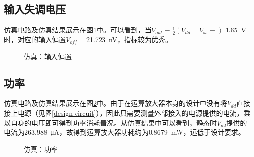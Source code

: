 \documentclass[UTF8]{ctexart}
\numberwithin{figure}{subsection}
\numberwithin{table}{subsection}
\numberwithin{equation}{subsection}
\begin{document}
\subsection{输入失调电压}
仿真电路及仿真结果展示在图\ref{Voff simulation}中。可以看到，当\(V_{out} = \frac{1}{2}\left(V_{dd} + V_{ss} = \right)\) \SI[]{1.65}{\volt}时，对应的输入偏置\(V_{off} = \)\SI[]{21.723}{\nano\volt}，指标较为优秀。

\begin{figure}[H]
    \centering
    \caption{仿真：输入偏置}
    \label{Voff simulation}
\end{figure}

\subsection{功率}
仿真电路及仿真结果展示在图\ref{Pdiss simulation}中。由于在运算放大器本身的设计中没有将\(V_{dd}\)直接接上电源（见图\ref{design circuit}），因此只需要测量外部接入的电源提供的电流，乘以自身的电压即可得到功率消耗情况。从仿真结果中可以看到，静态时\(V_{dd}\)提供的电流为\SI[]{263.988}{\micro\ampere}，故得到运算放大器功耗约为\SI[]{0.8679}{\milli\watt}，远低于设计要求。

\begin{figure}[H]
    \centering
    \caption{仿真：功率}
    \label{Pdiss simulation}
\end{figure}
\end{document}
